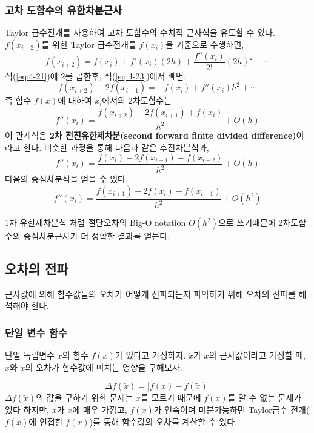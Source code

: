 \subsubsection{고차 도함수의 유한차분근사}
Taylor 급수전개를 사용하여 고차 도함수의 수치적 근사식을 유도할 수 있다. $f(x_{i+2})$를 위한 Taylor 급수전개를 $f(x_{i})$을 기준으로 수행하면,
\begin{equation}
f\left(x_{i+2}\right) = f(x_{i})+f'(x_{i})(2h)+\frac{f''(x_{i})}{2!}(2h)^2 + \cdots
\label{eq:4-23}
\end{equation}
식(\ref{eq:4-21})에 2를 곱한후, 식(\ref{eq:4-23})에서 빼면,
\begin{equation}
f(x_{i+2})-2f(x_{i+1})=-f(x_{i})+f''(x_{i})h^2 + \cdots
\end{equation}
즉 함수 $f(x)$에 대하여 $x_{i}$에서의 2차도함수는
\begin{equation}
f''(x_i)=\frac{f(x_{i+2})-2f(x_{i+1})+f(x_i)}{h^2}+O(h)
\end{equation}
이 관계식은 \textbf{2차 전진유한제차분(second forward finite divided difference)}이라고 한다. 비슷한 과정을 통해 다음과 같은 후진차분식과,
\begin{equation}
f''(x_i)=\frac{f(x_{i})-2f(x_{i-1})+f(x_{i-2})}{h^2}+O(h)
\end{equation}
다음의 중심차분식을 얻을 수 있다.
\begin{equation}
f''(x_i)=\frac{f(x_{i+1})-2f(x_i)+f(x_{i-1})}{h^2}+O(h^2)
\end{equation}

1차 유한제차분식 처럼 절단오차의 Big-O notation $O(h^2)$으로 쓰기때문에 2차도함수의 중심차분근사가 더 정확한 결과를 얻는다.

\subsection{오차의 전파}
근사값에 의해 함수값들의 오차가 어떻게 전파되는지 파악하기 위해 오차의 전파를 해석해야 한다.
\subsubsection{단일 변수 함수}
단일 독립변수 $x$의 함수 $f(x)$가 있다고 가정하자. $\tilde{x}$가 $x$의 근사값이라고 가정할 때, $x$와 $\tilde{x}$의 오차가 함수값에 미치는 영향을 구해보자.

\begin{equation}
\Delta f(\tilde{x})=\left|f(x)-f(\tilde{x})\right|
\end{equation}
$\Delta f(\tilde{x})$의 값을 구하기 위한 문제는 $x$를 모르기 때문에 $f(x)$를 알 수 없는 문제가 있다 하지만, $\tilde{x}$가 $x$에 매우 가깝고, $f(\tilde{x})$가 연속이며 미분가능하면 Taylor급수 전개($f(\tilde{x})$에 인접한 $f(x)$)를 통해 함수값의 오차를 계산할 수 있다.

